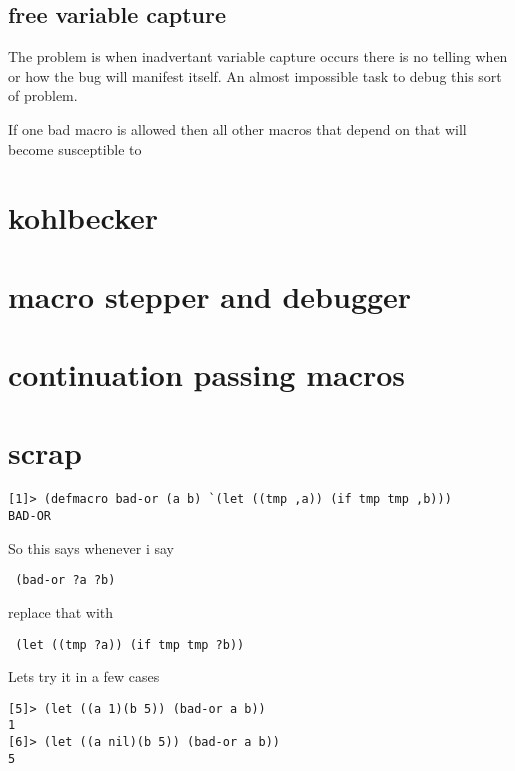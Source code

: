 \documentclass{article}
\begin{document}
\subsection{free variable capture}

The problem is when inadvertant variable capture occurs there is no telling
when or how the bug will manifest itself.  An almost impossible task to
debug this sort of problem.

If one bad macro is allowed then all other macros that depend on that will
become susceptible to 


\section{kohlbecker}

\section{macro stepper and debugger}


\section{continuation passing macros}


\section{scrap}

\begin{verbatim}
[1]> (defmacro bad-or (a b) `(let ((tmp ,a)) (if tmp tmp ,b)))
BAD-OR
\end{verbatim}

So this says whenever i say
\begin{verbatim}
 (bad-or ?a ?b)
\end{verbatim}

replace that with

\begin{verbatim}
 (let ((tmp ?a)) (if tmp tmp ?b))
\end{verbatim}








Lets try it in a few cases

\begin{verbatim}
[5]> (let ((a 1)(b 5)) (bad-or a b))
1
[6]> (let ((a nil)(b 5)) (bad-or a b))
5
\end{verbatim}
\end{document}
